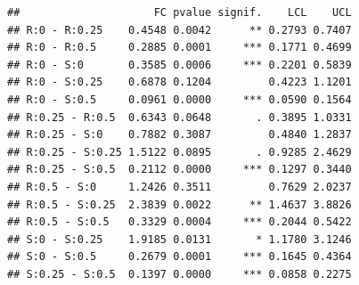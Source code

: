 \documentclass[
]{article}
\newenvironment{Shaded}{\begin{snugshade}}{\end{snugshade}}
\newcommand{\NormalTok}[1]{#1}
\newcommand{\SpecialCharTok}[1]{\textcolor[rgb]{0.81,0.36,0.00}{\textbf{#1}}}
\begin{document}
\begin{Shaded}
\end{Shaded}

\begin{verbatim}
##                     FC pvalue signif.    LCL    UCL
## R:0 - R:0.25    0.4548 0.0042      ** 0.2793 0.7407
## R:0 - R:0.5     0.2885 0.0001     *** 0.1771 0.4699
## R:0 - S:0       0.3585 0.0006     *** 0.2201 0.5839
## R:0 - S:0.25    0.6878 0.1204         0.4223 1.1201
## R:0 - S:0.5     0.0961 0.0000     *** 0.0590 0.1564
## R:0.25 - R:0.5  0.6343 0.0648       . 0.3895 1.0331
## R:0.25 - S:0    0.7882 0.3087         0.4840 1.2837
## R:0.25 - S:0.25 1.5122 0.0895       . 0.9285 2.4629
## R:0.25 - S:0.5  0.2112 0.0000     *** 0.1297 0.3440
## R:0.5 - S:0     1.2426 0.3511         0.7629 2.0237
## R:0.5 - S:0.25  2.3839 0.0022      ** 1.4637 3.8826
## R:0.5 - S:0.5   0.3329 0.0004     *** 0.2044 0.5422
## S:0 - S:0.25    1.9185 0.0131       * 1.1780 3.1246
## S:0 - S:0.5     0.2679 0.0001     *** 0.1645 0.4364
## S:0.25 - S:0.5  0.1397 0.0000     *** 0.0858 0.2275
\end{verbatim}
\end{document}
